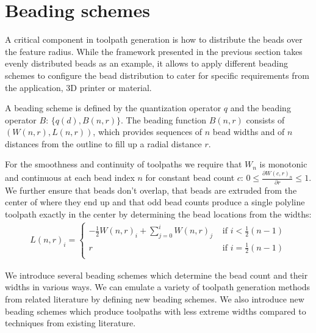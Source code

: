 \section{Beading schemes}\label{sec_generalization}
A critical component in toolpath generation is how to distribute the beads over the feature radius.
While the framework presented in the previous section takes evenly distributed beads as an example, it allows to apply different beading schemes to configure the bead distribution to cater for specific requirements from the application, 3D printer or material.










{
\begin{definition}\label{beading_scheme_definition}
A beading scheme is defined by the quantization operator $q$ and the beading operator $B$: $\{q(d), B(n ,r)\}$.
The beading function $B(n,r)$ consists of $\left( W(n,r), L(n,r) \right)$,
which provides sequences of $n$ bead widths and of $n$ distances from the outline to fill up a radial distance $r$.
\end{definition}
}




{
For the smoothness and continuity of toolpaths we require that $W_n$ is monotonic and continuous at each bead index $n$ for constant bead count $c$: $0 \leq \frac{\partial W(c, r)_n}{\partial r} \leq 1$.
We further ensure
that beads don't overlap,
that beads are extruded from the center of where they end up
and that odd bead counts produce a single polyline toolpath exactly in the center
by determining the bead locations from the widths:
}
\begin{align*}
L(n,r)_i = 
\begin{cases}
-\frac12 W(n,r)_i + \sum_{j=0}^i W(n,r)_j & \text{ if } i < \frac12 (n -1) \\
r & \text{ if } i =  \frac12 (n -1) \\
\end{cases}
\end{align*}





We introduce several beading schemes which determine the bead count and their widths in various ways.
We can emulate a variety of toolpath generation methods from related literature by defining new beading schemes.
We also introduce new beading schemes which produce toolpaths with less extreme widths compared to techniques from existing literature.












